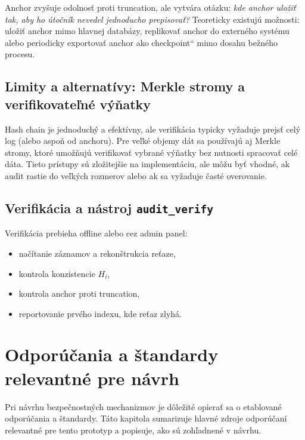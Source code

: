 \documentclass[journal,a4paper,onecolumn]{IEEEtran}
\newcommand{\uv}[1]{\quotedblbase#1\textquotedblleft}
\begin{document}
Anchor zvyšuje odolnosť proti truncation, ale vytvára otázku: \emph{kde anchor uložiť tak, aby ho útočník nevedel jednoducho prepisovať?} Teoreticky existujú možnosti: uložiť anchor mimo hlavnej databázy, replikovať anchor do externého systému alebo periodicky exportovať anchor ako \uv{checkpoint} mimo dosahu bežného procesu.

\subsection{Limity a alternatívy: Merkle stromy a verifikovateľné výňatky}

Hash chain je jednoduchý a efektívny, ale verifikácia typicky vyžaduje prejsť celý log (alebo aspoň od anchoru). Pre veľké objemy dát sa používajú aj Merkle stromy, ktoré umožňujú verifikovať vybrané výňatky bez nutnosti spracovať celé dáta. Tieto prístupy sú zložitejšie na implementáciu, ale môžu byť vhodné, ak audit rastie do veľkých rozmerov alebo ak sa vyžaduje časté overovanie.


\subsection{Verifikácia a nástroj \texttt{audit\_verify}}

Verifikácia prebieha offline alebo cez admin panel:

\begin{itemize}[leftmargin=*,itemsep=2pt]
  \item načítanie záznamov a rekonštrukcia reťaze,
  \item kontrola konzistencie \(H_i\),
  \item kontrola anchor proti truncation,
  \item reportovanie prvého indexu, kde reťaz zlyhá.
\end{itemize}






\section{Odporúčania a štandardy relevantné pre návrh}

Pri návrhu bezpečnostných mechanizmov je dôležité opierať sa o etablované odporúčania a štandardy. Táto kapitola sumarizuje hlavné zdroje odporúčaní relevantné pre tento prototyp a popisuje, ako sú zohľadnené v návrhu.
\end{document}
